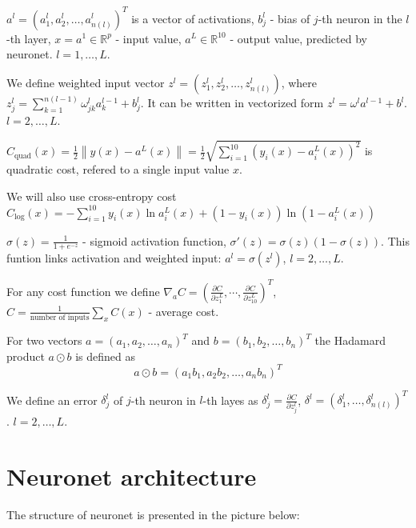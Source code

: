 \documentclass[a4paper,12pt]{article}
\theoremstyle{plain} %
\theoremstyle{definition} %
\theoremstyle{remark} %
\begin{document}
${a^l} = {\left( {a_1^l,a_2^l, \ldots, a_{n(l)}^l } \right)^T}$ is a vector of activations, ${b_j^l}$ - bias of $j$-th neuron in the $l$-th layer, $x = a^1 \in \mathbb {R}^p$ - input value, $a^L \in \mathbb  {R}^{10}$ - output value, predicted by neuronet. $l = 1, \ldots, L$.

We define weighted input vector ${z^l} = \left( {z_1^l,z_2^l, \ldots ,z_{n(l)}^l} \right)$, where $z_j^l = \sum\limits_{k = 1}^{n(l - 1)} {\omega _{jk}^la_k^{l - 1} + b_j^l}$. It can be written in vectorized form $z^l = \omega^la^{l-1}+b^l$. $l = 2, \ldots, L$.

${C_{\text{quad}}}(x) = \frac{1}{2}\left\| {y(x) - {a^L}(x)} \right\| = \frac{1}{2}\sqrt {\sum\limits_{i = 1}^{10} {{{\left( {{y_i}(x) - a_i^L(x)} \right)}^2}} } $ is quadratic cost, refered to a single input value $x$.

We will also use cross-entropy cost $C_\text{log}(x) =  - \sum\limits_{i = 1}^{10} {{y_i}(x)\ln a_i^L(x) + \left( {1 - {y_i}(x)} \right)\ln } \left( {1 - a_i^L(x)} \right)$

$\sigma (z) = \frac{1}{{1 + {e^{ - z}}}}$ - sigmoid activation function, $\sigma '(z) = \sigma (z)\left( {1 - \sigma (z)} \right)$. This funtion links activation and weighted input: $a^l = \sigma(z^l)$, $l = 2, \ldots, L$.

For any cost function we define ${\nabla _a}C = {\left( {\frac{{\partial C}}{{\partial z_1^L}}, \cdots ,\frac{{\partial C}}{{\partial z_{10}^L}}} \right)^T}$, $C = \frac{1}{{\text{number of inputs}}}\sum\limits_x {C(x)}$ - average cost.

For two vectors $a = {\left( {{a_1},{a_2}, \ldots ,{a_n}} \right)^T}$ and $b = {\left( {{b_1},{b_2}, \ldots ,{b_n}} \right)^T}$ the Hadamard product $a \odot b$ is defined as \[a \odot b=  {\left( {{a_1b_1},{a_2b_2}, \ldots ,{a_nb_n}} \right)^T} \]

We define an error $\delta _j^l$ of $j$-th neuron in $l$-th layes as $\delta _j^l = \frac{{\partial C}}{{\partial z_j^l}}$, $\delta^l = {\left( \delta _1^l, \ldots, \delta _{n(l)}^l \right)^T}$. $l = 2, \ldots, L$.

\newpage
\section{Neuronet architecture}

The structure of neuronet is presented in the picture below:
\end{document}
